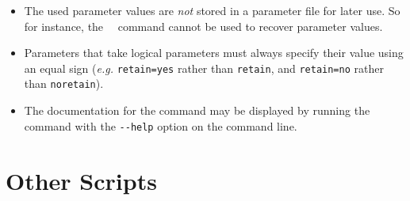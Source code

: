 \documentclass[oneside,11pt]{starlink}
\begin{document}
\begin{itemize}
\item The used parameter values are \emph{not} stored in a parameter file for
later use. So for instance, the \KAPPA\ \parget\ command cannot be used
to recover parameter values.
\item Parameters that take logical parameters must always specify their
value using an equal sign (\emph{e.g.} \verb+retain=yes+ rather than
\verb+retain+, and \verb+retain=no+ rather than \verb+noretain+).
\item The documentation for the command may be displayed by running the
command with the \verb+--help+ option on the command line.
\end{itemize}


\clearpage

\section{Other Scripts}

\sstminitoc{\ }
\end{document}
